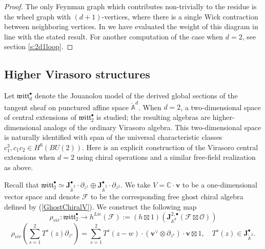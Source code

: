 \documentclass[11pt]{amsart}
\theoremstyle{definition}
\theoremstyle{remark}
\numberwithin{equation}{section}
\newcommand{\bu}{\bullet}
\begin{document}
\begin{proof}
  The only Feynman graph which contributes non-trivially to the residue is the wheel graph with $(d+1)$-vertices, where there is a single Wick contraction between neighboring vertices.
  In \cite{GWkm} we have evaluated the weight of this diagram in line with the stated result.
  For another computation of the case when $d=2$, see section \ref{s:2d1loop}.
\end{proof}


\subsection{Higher Virasoro structures}


Let $\mathfrak{witt}_d^\bu$ denote the Jouanolou model of the derived global sections of the tangent sheaf on
punctured affine space $\mathring{\mathbb{A}}^d$.
When $d=2$, a two-dimensional space of central extensions of $\mathfrak{witt}_2^\bu$ is studied; the resulting algebras
are higher-dimensional analogs of the ordinary Virasoro algebra.
This two-dimensional space is naturally identified with span of the universal characteristic classes $c_1^3, c_1c_2 \in
H^6(BU(2))$.
Here is an explicit construction of the Virasoro central extensions when $d=2$ using chiral operations and a similar
free-field realization as above. 

Recall that $\mathfrak{witt}^{\bullet}_{2}\simeq \mathbf{J}^{\bullet}_{\mathring{\mathbb{A}}^2}\cdot \partial_{z^1}\oplus\mathbf{J}^{\bullet}_{\mathring{\mathbb{A}}^2}\cdot \partial_{z^2}$. We take $V=\mathbb{C}\cdot \mathbf{v}$ to be a one-dimensional vector space and denote $\mathcal{F}$ to be the corresponding free ghost chiral algebra defined by (\ref{GhostChiralV}). We construct the following map
$$
\rho_{vir}:\mathfrak{witt}^{\bullet}_{2}\rightarrow h^{Lie}(\mathcal{F}):=(h\boxtimes 1)\left(\mathbf{J}^{2,\bullet}_{\mathbb{A}^d}(\mathcal{F}\boxtimes \mathcal{O})\right)
$$
$$
\rho_{vir}(\sum^2_{s=1}T^s(z)\partial_{z^s})=\sum^2_{s=1}T^s(z-w)\cdot(\mathbf{v}^{\vee}\otimes \partial_{z^s})\cdot \mathbf{v}\boxtimes 1,\quad T^s(z)\in \mathbf{J}^{\bullet}_{\mathring{\mathbb{A}}^2}.
$$
\end{document}
